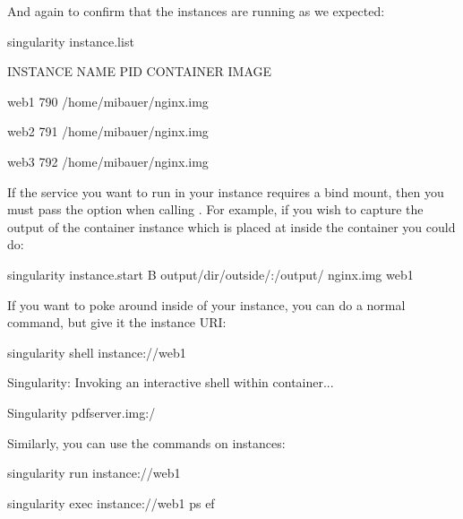 \documentclass[letterpaper,10pt,english]{sphinxmanual}
\begin{document}
And again to confirm that the instances are running as we expected:

%
\begin{sphinxVerbatim}[commandchars=\\\{\}]
\PYGZdl{} singularity instance.list

INSTANCE NAME    PID      CONTAINER IMAGE

web1             790      /home/mibauer/nginx.img

web2             791      /home/mibauer/nginx.img

web3             792      /home/mibauer/nginx.img
\end{sphinxVerbatim}

If the service you want to run in your instance requires a bind mount,
then you must pass the  option when calling . For example, if you wish to
capture the output of the  container instance which is placed at  inside
the container you could do:

%
\begin{sphinxVerbatim}[commandchars=\\\{\}]
\PYGZdl{} singularity instance.start \PYGZhy{}B output/dir/outside/:/output/ nginx.img  web1
\end{sphinxVerbatim}

If you want to poke around inside of your instance, you can do a normal 
command, but give it the instance URI:

%
\begin{sphinxVerbatim}[commandchars=\\\{\}]
\PYGZdl{} singularity shell instance://web1

Singularity: Invoking an interactive shell within container...


Singularity pdf\PYGZus{}server.img:\PYGZti{}/\PYGZgt{}
\end{sphinxVerbatim}

Similarly, you can use the  commands on instances:

%
\begin{sphinxVerbatim}[commandchars=\\\{\}]
\PYGZdl{} singularity run instance://web1

\PYGZdl{} singularity exec instance://web1 ps \PYGZhy{}ef
\end{sphinxVerbatim}
\end{document}
